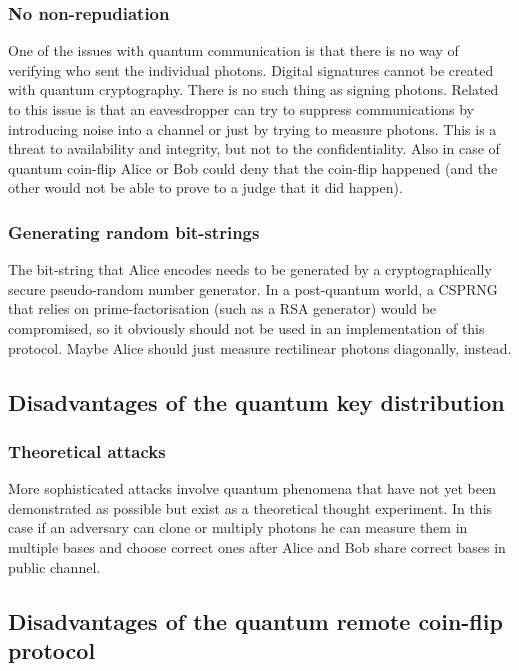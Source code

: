 \documentclass[oneside,a4paper]{article}
\begin{document}
\subsubsection{No non-repudiation}
One of the issues with quantum communication is that there is no way of verifying who sent the individual photons. Digital signatures cannot be created with quantum cryptography. There is no such thing as signing photons. Related to this issue is that an eavesdropper can try to suppress communications by introducing noise into a channel or just by trying to measure photons. This is a threat to availability and integrity, but not to the confidentiality.
Also in case of quantum coin-flip Alice or Bob could deny that the coin-flip happened (and the other would not be able to prove to a judge that it did happen).

\subsubsection{Generating random bit-strings}
The bit-string that Alice encodes needs to be generated by a cryptographically secure pseudo-random number generator.
In a post-quantum world, a CSPRNG that relies on prime-factorisation (such as a RSA generator) would be compromised, so it obviously should not be used in an implementation of this protocol.
Maybe Alice should just measure rectilinear photons diagonally, instead.

\subsection{Disadvantages of the quantum key distribution}
\subsubsection{Theoretical attacks}
More sophisticated attacks involve quantum phenomena that have not yet been demonstrated as possible but exist as a theoretical thought experiment. In this case if an adversary can clone or multiply photons he can measure them in multiple bases and choose correct ones after Alice and Bob share correct bases in public channel.

\subsection{Disadvantages of the quantum remote coin-flip protocol}
\end{document}
